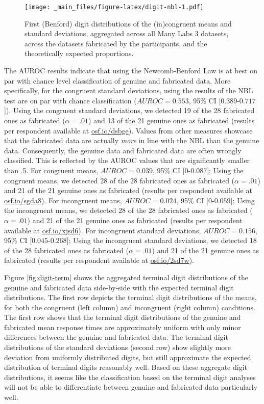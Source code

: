 \documentclass[a5paper]{book}
\begin{document}
\begin{figure}
\centering
\texttt{[image: \_main\_files/figure-latex/digit-nbl-1.pdf]}
\caption{\label{fig:digit-nbl}First (Benford) digit distributions of the
(in)congruent means and standard deviations, aggregated across all Many
Labs 3 datasets, across the datasets fabricated by the participants, and
the theoretically expected proportions.}
\end{figure}

The AUROC results indicate that using the Newcomb-Benford Law is at best
on par with chance level classification of genuine and fabricated data.
More specifically, for the congruent standard deviations, using the
results of the NBL test are on par with chance classification
(\(AUROC=0.553\), 95\% CI {[}\(0.389\)-\(0.717\){]}). Using the
congruent standard deviations, we detected 19 of the 28 fabricated ones
as fabricated (\(\alpha=.01\)) and 13 of the 21 genuine ones as
fabricated (results per respondent available at
\href{https://osf.io/dsbge}{osf.io/dsbge}). Values from other measures
showcase that the fabricated data are actually \emph{more} in line with
the NBL than the genuine data. Consequently, the genuine data and
fabricated data are often wrongly classified. This is reflected by the
AUROC values that are significantly smaller than .5. For congruent
means, \(AUROC=0.039\), 95\% CI {[}\(0\)-\(0.087\){]}; Using the
congruent means, we detected 28 of the 28 fabricated ones as fabricated
(\(\alpha=.01\)) and 21 of the 21 genuine ones as fabricated (results
per respondent available at \href{https://osf.io/sgda8}{osf.io/sgda8}).
For incongruent means, \(AUROC=0.024\), 95\% CI {[}\(0\)-\(0.059\){]};
Using the incongruent means, we detected 28 of the 28 fabricated ones as
fabricated (\(\alpha=.01\)) and 21 of the 21 genuine ones as fabricated
(results per respondent available at
\href{https://osf.io/xjsd6}{osf.io/xjsd6}). For incongruent standard
deviations, \(AUROC=0.156\), 95\% CI {[}\(0.045\)-\(0.268\){]}; Using
the incongruent standard deviations, we detected 18 of the 28 fabricated
ones as fabricated (\(\alpha=.01\)) and 21 of the 21 genuine ones as
fabricated (results per respondent available at
\href{https://osf.io/2sd7w}{osf.io/2sd7w}).

Figure \ref{fig:digit-term} shows the aggregated terminal digit
distributions of the genuine and fabricated data side-by-side with the
expected terminal digit distributions. The first row depicts the
terminal digit distributions of the means, for both the congruent (left
column) and incongruent (right column) conditions. The first row shows
that the terminal digit distributions of the genuine and fabricated mean
response times are approximately uniform with only minor differences
between the genuine and fabricated data. The terminal digit
distributions of the standard deviations (second row) show slightly more
deviation from uniformly distributed digits, but still approximate the
expected distribution of terminal digits reasonably well. Based on these
aggregate digit distributions, it seems like the classification based on
the terminal digit analyses will not be able to differentiate between
genuine and fabricated data particularly well.
\end{document}
